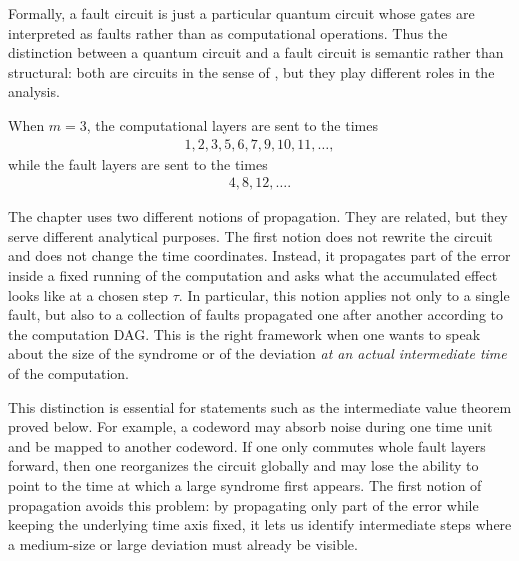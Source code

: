 \begin{remark}
  Formally, a fault circuit is just a particular quantum circuit whose gates are interpreted as faults rather than as computational operations. Thus the distinction between a quantum circuit and a fault circuit is semantic rather than structural: both are circuits in the sense of , but they play different roles in the analysis.
\end{remark}

\begin{example}
  When $m=3$, the computational layers are sent to the times
  \begin{equation*}
    \begin{split}
      1,2,3,5,6,7,9,10,11,\ldots,
    \end{split}
  \end{equation*}
  while the fault layers are sent to the times
  \begin{equation*}
    \begin{split}
      4,8,12,\ldots.
    \end{split}
  \end{equation*}
\end{example}


The chapter uses two different notions of propagation. They are related, but they serve different analytical purposes. The first notion does not rewrite the circuit and does not change the time coordinates. Instead, it propagates part of the error inside a fixed running of the computation and asks what the accumulated effect looks like at a chosen step $\tau$. In particular, this notion applies not only to a single fault, but also to a collection of faults propagated one after another according to the computation DAG. This is the right framework when one wants to speak about the size of the syndrome or of the deviation \emph{at an actual intermediate time} of the computation.

This distinction is essential for statements such as the intermediate value theorem proved below. For example, a codeword may absorb noise during one time unit and be mapped to another codeword. If one only commutes whole fault layers forward, then one reorganizes the circuit globally and may lose the ability to point to the time at which a large syndrome first appears. The first notion of propagation avoids this problem: by propagating only part of the error while keeping the underlying time axis fixed, it lets us identify intermediate steps where a medium-size or large deviation must already be visible.

